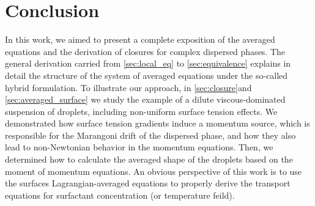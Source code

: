 \section{Conclusion}
\label{sec:conclusion}




In this work, we aimed to present a complete exposition of the averaged equations and the derivation of closures for complex dispersed phases. 
The general derivation carried from \ref{sec:local_eq} to \ref{sec:equivalence} explains in detail the structure of the system of averaged equations under the so-called hybrid formulation.  
To illustrate our approach, in \ref{sec:closure}and \ref{sec:averaged_surface} we study the example of a dilute viscous-dominated suspension of droplets, including non-uniform surface tension effects. 
We demonstrated how surface tension gradients induce a momentum source, which is responsible for the Marangoni drift of the dispersed phase, and how they also lead to non-Newtonian behavior in the momentum equations. 
Then, we determined how to calculate the averaged shape of the droplets based on the moment of momentum equations. 
An obvious perspective of this work is to use the surfaces Lagrangian-averaged equations to properly derive the transport equations for surfactant concentration (or temperature feild).  


